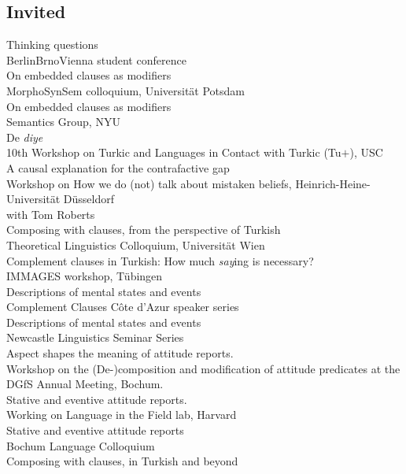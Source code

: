 \documentclass[11pt, a4paper]{article} %
\newcommand{\years}[1]{\marginnote{\scriptsize #1}} %
\begin{document}
\subsection*{Invited}
\years{2025} Thinking questions \\
BerlinBrnoVienna student conference \\[.25em] %
On embedded clauses as modifiers \\
MorphoSynSem colloquium, Universit\"at Potsdam \\[.25em] %
On embedded clauses as modifiers \\
Semantics Group, NYU \\[.25em]
De \emph{diye} \\
10th Workshop on Turkic and Languages in Contact with Turkic
(Tu$+$), USC \\[.25em]
\newpage
A causal explanation for the contrafactive gap \\
Workshop on How we do (not) talk about mistaken beliefs,
Heinrich-Heine-Universit\"at D\"usseldorf \\
with Tom Roberts \\[.25em]
\years{2024} Composing with clauses, from the perspective of Turkish \\ 
Theoretical Linguistics Colloquium, Universit\"at Wien \\[.25em]
Complement clauses in Turkish: How much \emph{say}ing is necessary? \\
IMMAGES workshop, T\"ubingen \\[.25em]
Descriptions of mental states and events \\
Complement Clauses C\^ote d'Azur speaker series \\[.25em]
Descriptions of mental states and events \\
Newcastle Linguistics Seminar Series \\[.25em]
Aspect shapes the meaning of attitude reports. \\
Workshop on the (De-)composition and modification of attitude predicates at the
DGfS Annual Meeting, Bochum. \\[.25em] 
\years{2023} Stative and eventive attitude reports. \\
Working on Language in the Field lab, Harvard \\[.25em]
Stative and eventive attitude reports \\
Bochum Language Colloquium \\ [.25em]
Composing with clauses, in Turkish and beyond \\
\end{document}

